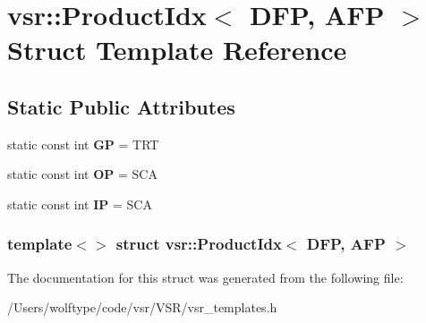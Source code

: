 \hypertarget{structvsr_1_1_product_idx_3_01_d_f_p_00_01_a_f_p_01_4}{\section{vsr\-:\-:Product\-Idx$<$ D\-F\-P, A\-F\-P $>$ Struct Template Reference}
\label{structvsr_1_1_product_idx_3_01_d_f_p_00_01_a_f_p_01_4}
}
\subsection*{Static Public Attributes}
\begin{DoxyCompactItemize}
\item 
\hypertarget{structvsr_1_1_product_idx_3_01_d_f_p_00_01_a_f_p_01_4_a73f69ed9a972a973b12a02e83a6a56c0}{static const int {\bfseries G\-P} = T\-R\-T}\label{structvsr_1_1_product_idx_3_01_d_f_p_00_01_a_f_p_01_4_a73f69ed9a972a973b12a02e83a6a56c0}

\item 
\hypertarget{structvsr_1_1_product_idx_3_01_d_f_p_00_01_a_f_p_01_4_afc283b9d019407bb04837756c4fed03f}{static const int {\bfseries O\-P} = S\-C\-A}\label{structvsr_1_1_product_idx_3_01_d_f_p_00_01_a_f_p_01_4_afc283b9d019407bb04837756c4fed03f}

\item 
\hypertarget{structvsr_1_1_product_idx_3_01_d_f_p_00_01_a_f_p_01_4_a6f181f7e534b5b150afd22a9d63a91b0}{static const int {\bfseries I\-P} = S\-C\-A}\label{structvsr_1_1_product_idx_3_01_d_f_p_00_01_a_f_p_01_4_a6f181f7e534b5b150afd22a9d63a91b0}

\end{DoxyCompactItemize}
\subsubsection*{template$<$$>$ struct vsr\-::\-Product\-Idx$<$ D\-F\-P, A\-F\-P $>$}



The documentation for this struct was generated from the following file\-:\begin{DoxyCompactItemize}
\item 
/\-Users/wolftype/code/vsr/\-V\-S\-R/vsr\-\_\-templates.\-h\end{DoxyCompactItemize}
